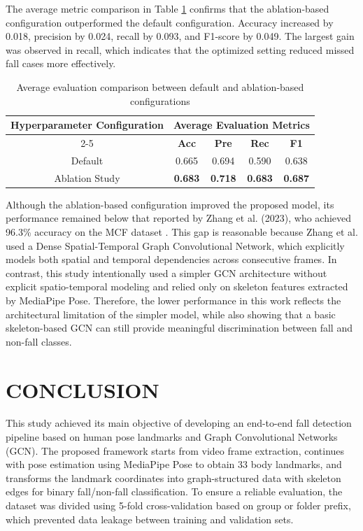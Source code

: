 \documentclass[10pt,TimesNewRoman,a4paper]{matrikenglish}
\begin{document}
The average metric comparison in Table \ref{tab:perbandingan hasil hyperparameter default dan studi ablasi} confirms that the ablation-based configuration outperformed the default configuration. Accuracy increased by 0.018, precision by 0.024, recall by 0.093, and F1-score by 0.049. The largest gain was observed in recall, which indicates that the optimized setting reduced missed fall cases more effectively.

\begin{table}[H]
    \centering
    \caption{Average evaluation comparison between default and ablation-based configurations}
    \label{tab:perbandingan hasil hyperparameter default dan studi ablasi}
    \begin{tabular}{c c c c c}
        \hline
        \multirow{2}{*}{\textbf{Hyperparameter Configuration}} & \multicolumn{4}{c}{\textbf{Average Evaluation Metrics}} \\ \cline{2-5}
         & \textbf{Acc} & \textbf{Pre} & \textbf{Rec} & \textbf{F1} \\ \hline
        Default & 0.665 & 0.694 & 0.590 & 0.638 \\ 
        Ablation Study & \textbf{0.683} & \textbf{0.718} & \textbf{0.683} & \textbf{0.687} \\ \hline
    \end{tabular}
\end{table}

Although the ablation-based configuration improved the proposed model, its performance remained below that reported by Zhang et al. (2023), who achieved 96.3\% accuracy on the MCF dataset \cite{Zhang2023}. This gap is reasonable because Zhang et al. used a Dense Spatial-Temporal Graph Convolutional Network, which explicitly models both spatial and temporal dependencies across consecutive frames. In contrast, this study intentionally used a simpler GCN architecture without explicit spatio-temporal modeling and relied only on skeleton features extracted by MediaPipe Pose. Therefore, the lower performance in this work reflects the architectural limitation of the simpler model, while also showing that a basic skeleton-based GCN can still provide meaningful discrimination between fall and non-fall classes.


\section{CONCLUSION}
\label{}

This study achieved its main objective of developing an end-to-end fall detection pipeline based on human pose landmarks and Graph Convolutional Networks (GCN). The proposed framework starts from video frame extraction, continues with pose estimation using MediaPipe Pose to obtain 33 body landmarks, and transforms the landmark coordinates into graph-structured data with skeleton edges for binary fall/non-fall classification. To ensure a reliable evaluation, the dataset was divided using 5-fold cross-validation based on group or folder prefix, which prevented data leakage between training and validation sets.
\end{document}
